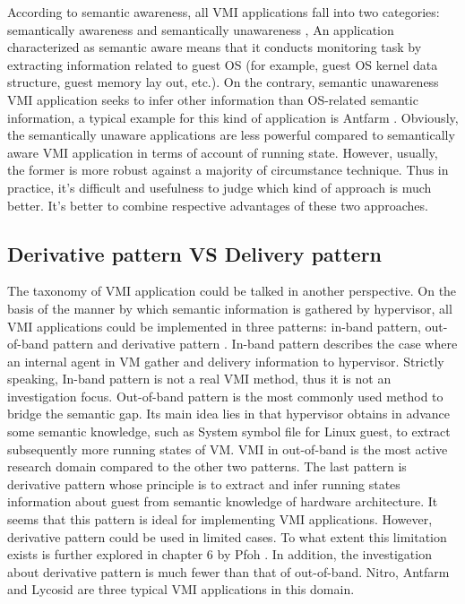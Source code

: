 According to semantic awareness, all VMI applications fall into two categories: semantically awareness and semantically unawareness \cite{Reference3}, 
An application characterized as semantic aware means that it conducts monitoring task by extracting information related to guest OS (for example,
guest OS kernel data structure, guest memory lay out, etc.). On the contrary, semantic unawareness VMI application seeks to infer other information 
than OS-related semantic information, a typical example for this kind of application is Antfarm  \cite{Reference4}. Obviously, the semantically unaware
applications are less powerful compared to semantically aware VMI application in terms of account of running state. However, usually, the former 
is more robust against a majority of circumstance technique. Thus in practice, it’s difficult and usefulness to judge which kind of approach is 
much better. It’s better to combine respective advantages of these two approaches.

\subsection{Derivative pattern VS Delivery pattern}

The taxonomy of VMI application could be talked in another perspective. On the basis of the manner by which semantic information is gathered by 
hypervisor, all VMI applications could be implemented in three patterns: in-band pattern, out-of-band pattern and derivative pattern \cite{Reference5}.
In-band pattern describes the case where an internal agent in VM gather and delivery information to hypervisor. Strictly speaking, In-band 
pattern is not a real VMI method, thus it is not an investigation focus. Out-of-band pattern is the most commonly used method to bridge the 
semantic gap. Its main idea lies in that hypervisor obtains in advance some semantic knowledge, such as System symbol file for Linux guest, 
to extract subsequently more running states of VM. VMI in out-of-band is the most active research domain compared to the other two patterns. 
The last pattern is derivative pattern whose principle is to extract and infer running states information about guest from semantic knowledge 
of hardware architecture. It seems that this pattern is ideal for implementing VMI applications. However, derivative pattern could be used in 
limited cases. To what extent this limitation exists is further explored in chapter 6 by Pfoh \cite{Reference7}. In addition, the investigation 
about derivative pattern is much fewer than that of out-of-band. Nitro, Antfarm and Lycosid \cite{Reference4, Reference8, Reference9} are three 
typical VMI applications in this domain.

